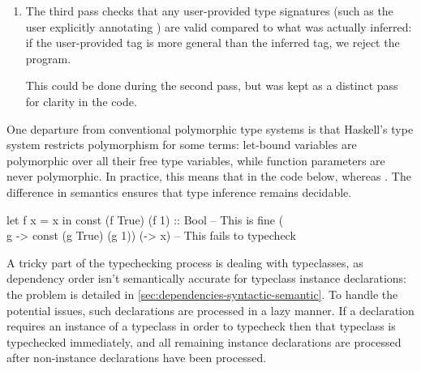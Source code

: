 \documentclass[dissertation.tex]{subfiles}
\begin{document}
{{{\begin{enumerate}
{            }
            \item
            {

                The third pass checks that any user-provided type signatures (such as the user explicitly annotating
                ) are valid compared to what was actually inferred: if the user-provided tag is more
                general than the inferred tag, we reject the program.

                This could be done during the second pass, but was kept as a distinct pass for clarity in the code.

            }
            \end{enumerate}

            One departure from conventional polymorphic type systems is that Haskell's type system restricts
            polymorphism for some terms: let-bound variables are polymorphic over all their free type variables, while
            function parameters are never polymorphic. In practice, this means that in the code below,  whereas . The
            difference in semantics ensures that type inference remains decidable.
 
            \begin{haskellfigure}
            let f x = x in const (f True) (f 1) :: Bool -- This is fine
            (\\g -> const (g True) (g 1)) (\x -> x)     -- This fails to typecheck
            \end{haskellfigure}


            A tricky part of the typechecking process is dealing with typeclasses, as dependency order isn't
            semantically accurate for typeclass instance declarations: the problem is detailed in
            \ref{sec:dependencies-syntactic-semantic}. To handle the potential issues, such declarations are processed
            in a lazy manner. If a declaration requires an instance of a typeclass in order to typecheck then that
            typeclass is typechecked immediately, and all remaining instance declarations are processed after
            non-instance declarations have been processed.

}}}
\end{document}
